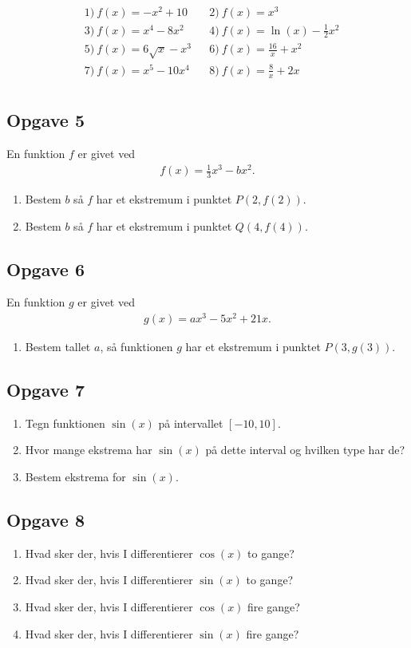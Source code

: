 \begin{align*}
	&1) \ f(x) = -x^2+10    &&2) \  f(x) = x^3     \\
	&3) \  f(x) = x^4-8x^2   &&4) \ f(x) = \ln(x) - \frac{1}{2}x^2      \\
	&5) \  f(x) = 6\sqrt{x}-x^3    &&6) \   f(x) = \frac{16}{x} +x^2    \\
	&7) \  f(x) = x^5-10x^4   &&8) \ f(x) = \frac{8}{x} + 2x      \\
\end{align*}

\subsection*{Opgave 5}
En funktion $f$ er givet ved
\begin{align*}
	f(x) = \frac{1}{3}x^3 - bx^2.
\end{align*}
\begin{enumerate}[label=\roman*)]
	\item Bestem $b$ så $f$ har et ekstremum i punktet $P(2,f(2))$.
	\item Bestem $b$ så $f$ har et ekstremum i punktet $Q(4,f(4))$.
\end{enumerate}

\subsection*{Opgave 6}
En funktion $g$ er givet ved
\begin{align*}
	g(x) = ax^3 - 5x^2 + 21x.
\end{align*}
\begin{enumerate}[label=\roman*)]
	\item Bestem tallet $a$, så funktionen $g$ har et ekstremum i punktet $P(3,g(3))$.
\end{enumerate}



\subsection*{Opgave 7}
\begin{enumerate}[label=\roman*)]
	\item Tegn funktionen $\sin(x)$ på intervallet $[-10,10]$.
	\item Hvor mange ekstrema har $\sin(x)$ på dette interval og hvilken type har de?
	\item Bestem ekstrema for $\sin(x)$.
\end{enumerate}

\subsection*{Opgave 8}
\begin{enumerate}[label=\roman*)]
	\item Hvad sker der, hvis I differentierer $\cos(x)$ to gange?
	\item Hvad sker der, hvis I differentierer $\sin(x)$ to gange?
	\item Hvad sker der, hvis I differentierer $\cos(x)$ fire gange?
	\item Hvad sker der, hvis I differentierer $\sin(x)$ fire gange?
\end{enumerate}